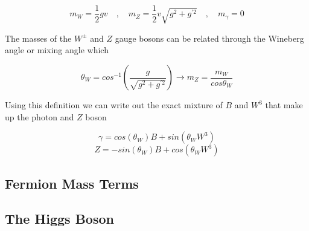 \begin{equation}
m_{W} = \frac{1}{2}gv \quad , \quad m_Z = \frac{1}{2}v\sqrt{g^{2} + g^{'2}}
\quad , \quad m_\gamma = 0
\end{equation}

The masses of the $W^{\pm}$ and $Z$ gauge bosons can be related through the
Wineberg angle or mixing angle which

\begin{equation}
\theta_W = cos^{-1}\left( \frac{g}{\sqrt{g^{2}+g^{'2}}} \right) \rightarrow m_{Z} =
\frac{m_{W}}{cos{\theta_{W}}}
\end{equation}

Using this definition we can write out the exact mixture of $B$ and $W^{3}$ that
make up the photon and $Z$ boson

\begin{equation}
\gamma = cos(\theta_{W})B + sin(\theta_{W}W^{3})
\end{equation}
\begin{equation}
Z = -sin(\theta_{W})B + cos(\theta_{W}W^{3})
\end{equation}

\subsection{Fermion Mass Terms}

\subsection{The Higgs Boson}


